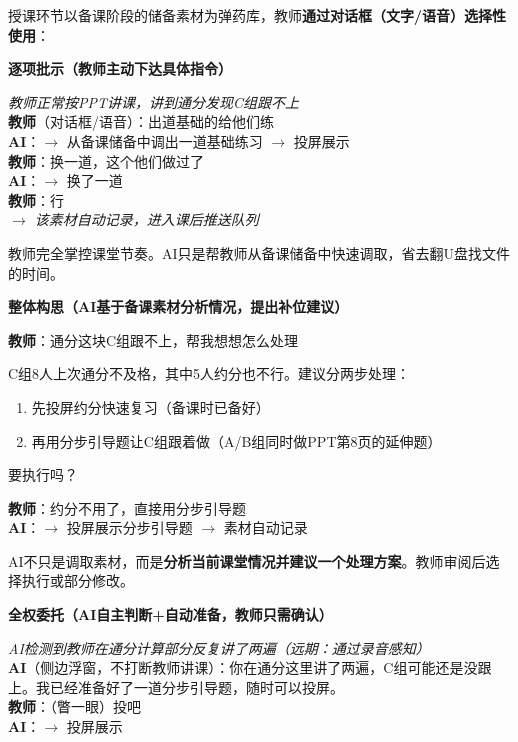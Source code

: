 \documentclass[11pt,a4paper]{article}
\newcommand{\done}{\ding{192}}
\newcommand{\dtwo}{\ding{193}}
\newcommand{\dthree}{\ding{194}}
\begin{document}
授课环节以备课阶段的储备素材为弹药库，教师\textbf{通过对话框（文字/语音）选择性使用}：

\bigskip
\noindent\textbf{\done{} 逐项批示（教师主动下达具体指令）}

\begin{dialogue}
\textit{教师正常按PPT讲课，讲到通分发现C组跟不上}\\[4pt]
\textbf{教师}（对话框/语音）：出道基础的给他们练\\
\textbf{AI}：$\rightarrow$ 从备课储备中调出一道基础练习 $\rightarrow$ 投屏展示\\
\textbf{教师}：换一道，这个他们做过了\\
\textbf{AI}：$\rightarrow$ 换了一道\\
\textbf{教师}：行\\
\textit{$\rightarrow$ 该素材自动记录，进入课后推送队列}
\end{dialogue}

教师完全掌控课堂节奏。AI只是帮教师从备课储备中快速调取，省去翻U盘找文件的时间。

\bigskip
\noindent\textbf{\dtwo{} 整体构思（AI基于备课素材分析情况，提出补位建议）}

\begin{dialogue}
\textbf{教师}：通分这块C组跟不上，帮我想想怎么处理
\end{dialogue}

\begin{aiplan}[课堂补位建议]
C组8人上次通分不及格，其中5人约分也不行。建议分两步处理：
\begin{enumerate}[leftmargin=1.5em,nosep]
  \item 先投屏约分快速复习（备课时已备好）
  \item 再用分步引导题让C组跟着做（A/B组同时做PPT第8页的延伸题）
\end{enumerate}
要执行吗？
\end{aiplan}

\begin{dialogue}
\textbf{教师}：约分不用了，直接用分步引导题\\
\textbf{AI}：$\rightarrow$ 投屏展示分步引导题 $\rightarrow$ 素材自动记录
\end{dialogue}

AI不只是调取素材，而是\textbf{分析当前课堂情况并建议一个处理方案}。教师审阅后选择执行或部分修改。

\bigskip
\noindent\textbf{\dthree{} 全权委托（AI自主判断+自动准备，教师只需确认）}

\begin{dialogue}
\textit{AI检测到教师在通分计算部分反复讲了两遍（远期：通过录音感知）}\\[4pt]
\textbf{AI}（侧边浮窗，不打断教师讲课）：你在通分这里讲了两遍，C组可能还是没跟上。我已经准备好了一道分步引导题，随时可以投屏。\\[4pt]
\textbf{教师}：（瞥一眼）投吧\\
\textbf{AI}：$\rightarrow$ 投屏展示
\end{dialogue}
\end{document}
